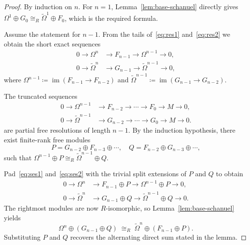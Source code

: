\documentclass[aps,prx,english,superscriptaddress,twocolumn,tightenlines,showpacs,longbibliography,floatfix,amsfonts]{revtex4-2}
\theoremstyle{remark}
\theoremstyle{definition}
\begin{document}
\begin{proof}
	By induction on $n$. For $n=1$, Lemma~\ref{lem:base-schanuel} directly
	gives $\Omega^1 \oplus G_0 \cong_R \widetilde{\Omega}^1 \oplus F_0$, which
	is the required formula.

	Assume the statement for $n-1$. From the tails of~\eqref{eq:res1}
	and~\eqref{eq:res2} we obtain the short exact sequences
	\begin{align}
		0 \to \Omega^n &\to F_{n-1} \to \Omega^{n-1} \to 0, \label{eq:ses1}\\
		0 \to \widetilde{\Omega}^n &\to G_{n-1} \to \widetilde{\Omega}^{n-1}
		\to 0, \label{eq:ses2}
	\end{align}
	where $\Omega^{n-1} \coloneqq \operatorname{im}(F_{n-1}\to F_{n-2})$
	and $\widetilde{\Omega}^{n-1} \coloneqq \operatorname{im}(G_{n-1}\to G_{n-2})$.

	The truncated sequences
	\begin{equation}
		\begin{split}
			0 \to \Omega^{n-1} &\to F_{n-2} \to \cdots \to F_0 \to M \to 0,\\
			0 \to \widetilde{\Omega}^{n-1} &\to G_{n-2} \to \cdots \to G_0 \to M \to 0 .
		\end{split}
	\end{equation}
	are partial free resolutions of length $n-1$. By the induction hypothesis,
	there exist finite-rank free modules
	\begin{equation}
		P = G_{n-2} \oplus F_{n-3} \oplus \cdots,\quad
		Q = F_{n-2} \oplus G_{n-3} \oplus \cdots,
	\end{equation}
	such that $\Omega^{n-1} \oplus P \cong_R \widetilde{\Omega}^{n-1} \oplus Q$.

	Pad~\eqref{eq:ses1} and~\eqref{eq:ses2} with the trivial split extensions of
	$P$ and $Q$ to obtain
	\begin{align}
		0 \to \Omega^n &\to F_{n-1}\oplus P \to \Omega^{n-1}\oplus P \to 0,\\
		0 \to \widetilde{\Omega}^n &\to G_{n-1}\oplus Q
		\to \widetilde{\Omega}^{n-1}\oplus Q \to 0.
	\end{align}
	The rightmost modules are now \(R\)-isomorphic, so Lemma~\ref{lem:base-schanuel}
	yields
	\begin{equation}
		\Omega^n \oplus (G_{n-1}\oplus Q) \;\cong_R\;
		\widetilde{\Omega}^n \oplus (F_{n-1}\oplus P).
	\end{equation}
	Substituting $P$ and $Q$ recovers the alternating direct sum stated in
	the lemma.
\end{proof}
\end{document}
